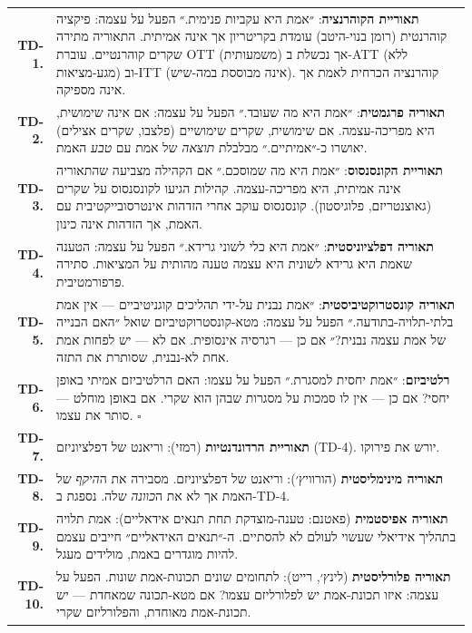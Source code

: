 \documentclass[10pt, openany, oneside]{book}
\renewcommand{\footnotesize}{\fontsize{8.5}{11}\selectfont}
\begin{document}
{\footnotesize
\noindent\begin{tabular}{r p{}}
\textbf{TD-1.} & \textbf{תאוריית הקוהרנציה}: ״אמת היא עקביות פנימית.״ הפעל על עצמה: פיקציה קוהרנטית (רומן בנוי-היטב) עומדת בקריטריון אך אינה אמיתית. התאוריה מתירה שקרים קוהרנטיים. עוברת OTT (משמעותית) אך נכשלת ב-ATT (ללא מגע-מציאות) וב-ITT (אינה מבוססת במה-שיש). קוהרנציה הכרחית לאמת אך אינה מספיקה. \\[0.5em]
\textbf{TD-2.} & \textbf{תאוריה פרגמטית}: ״אמת היא מה שעובד.״ הפעל על עצמה: אם אינה שימושית, היא מפריכה-עצמה. אם שימושית, שקרים שימושיים (פלצבו, שקרים אצילים) יאושרו כ-״אמיתיים.״ מבלבלת \textit{תוצאה} של אמת עם \textit{טבע} האמת. \\[0.5em]
\textbf{TD-3.} & \textbf{תאוריית הקונסנסוס}: ״אמת היא מה שמוסכם.״ אם הקהילה מצביעה שהתאוריה אינה אמיתית, היא מפריכה-עצמה. קהילות הגיעו לקונסנסוס על שקרים (גאוצנטריזם, פלוגיסטון). קונסנסוס עוקב אחרי הזדהות אינטרסובייקטיבית עם האמת, אך הזדהות אינה כינון. \\[0.5em]
\textbf{TD-4.} & \textbf{תאוריה דפלציוניסטית}: ״אמת היא כלי לשוני גרידא.״ הפעל על עצמה: הטענה שאמת היא גרידא לשונית היא עצמה טענה מהותית על המציאות. סתירה פרפורמטיבית. \\[0.5em]
\textbf{TD-5.} & \textbf{תאוריה קונסטרוקטיביסטית}: ״אמת נבנית על-ידי תהליכים קוגניטיביים — אין אמת בלתי-תלויה-בתודעה.״ הפעל על עצמה: מטא-קונסטרוקטיביזם שואל ״האם הבנייה של אמת עצמה נבנית?״ אם כן — רגרסיה אינסופית. אם לא — יש לפחות אמת אחת לא-נבנית, שסותרת את התזה. \\[0.5em]
\textbf{TD-6.} & \textbf{רלטיביזם}: ״אמת יחסית למסגרת.״ הפעל על עצמו: האם הרלטיביזם אמיתי באופן יחסי? אם כן — אין לו סמכות על מסגרות שבהן הוא שקרי. אם באופן מוחלט — סותר את עצמו. $\square$ \\[0.5em]
\textbf{TD-7.} & \textbf{תאוריית הרדונדנטיות} (רמזי): וריאנט של דפלציוניזם (TD-4). יורש את פירוקו. \\[0.3em]
\textbf{TD-8.} & \textbf{תאוריה מינימליסטית} (הורוויץ׳): וריאנט של דפלציוניזם. מסבירה את ה\textit{היקף} של האמת אך לא את ה\textit{כוונה} שלה. נספגת ב-TD-4. \\[0.3em]
\textbf{TD-9.} & \textbf{תאוריה אפיסטמית} (פאטנם: טענה-מוצדקת תחת תנאים אידאליים): אמת תלויה בתהליך אידיאלי שעשוי לעולם לא להסתיים. ה-״תנאים האידאליים״ חייבים עצמם להיות מוגדרים באמת, מולידים מעגל. \\[0.3em]
\textbf{TD-10.} & \textbf{תאוריה פלורליסטית} (לינץ׳, רייט): לתחומים שונים תכונות-אמת שונות. הפעל על עצמה: איזו תכונת-אמת יש לפלורליזם עצמו? אם מטא-תכונה שמאחדת — יש תכונת-אמת מאוחדת, והפלורליזם שקרי. \\[0.3em]

\end{tabular}}
\end{document}
